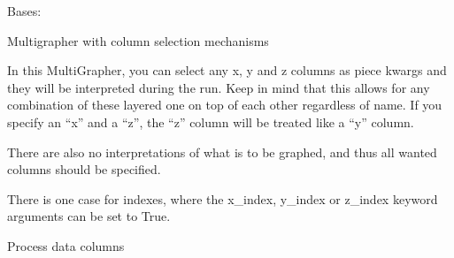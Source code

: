 \documentclass[letterpaper,10pt,english]{sphinxmanual}
\begin{document}
\begin{fulllineitems}
\label{\detokenize{dalio.application:dalio.application.PandasMultiGrapher}}
Bases: {\hyperref[\detokenize{dalio.application:dalio.application.graphers.MultiGrapher}]{}}

Multigrapher with column selection mechanisms

In this MultiGrapher, you can select any x, y and z columns as piece
kwargs and they will be interpreted during the run. Keep in mind that
this allows for any combination of these layered one on top of each other
regardless of name. If you specify an “x” and a “z”, the “z” column will
be treated like a “y” column.

There are also no interpretations of what
is to be graphed, and thus all wanted columns should be specified.

There is one case for indexes, where the x\_index, y\_index or z\_index
keyword arguments can be set to True.

\begin{fulllineitems}
\label{\detokenize{dalio.application:dalio.application.PandasMultiGrapher.build_model}}
Process data columns

\end{fulllineitems}


\end{fulllineitems}

\end{document}
